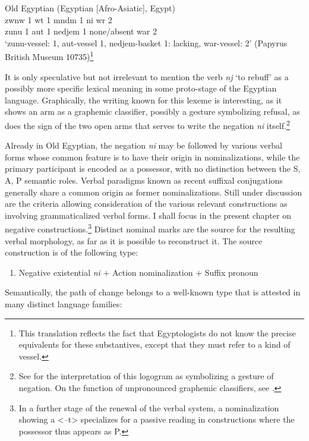 \documentclass[output=paper,draft,draftmode,colorlinks,citecolor=brown]{langscibook}
\begin{document}
\ea Old Egyptian (Egyptian [Afro-Asiatic], Egypt) \label{ex:AE3}\\
	\gll zwnw 1 {\ꜥ}wt 1 mndm 1 ni w{\ꜥ}r 2\\
	zunu 1 aut 1 nedjem 1 none/absent war 2\\
	\glt ‘zunu-vessel: 1, aut-vessel 1, nedjem-basket 1: lacking, war-vessel: 2’ (Papyrus	British Museum 10735)\footnote{This translation reflects the fact that Egyptologists do not know the precise equivalents for these substantives, except that they must refer to a kind of vessel.}
\z 

It is only speculative but not irrelevant to mention the verb \textit{nj} ‘to rebuff’ as a possibly more specific lexical meaning in some proto-stage of the Egyptian language. Graphically, the writing known for this lexeme is interesting, as it shows an arm as a graphemic classifier, possibly a gesture symbolizing refusal, as does the sign of the two open arms that serves to write the negation \textit{ni} itself.\footnote{See \citet[125]{Loprieno1995} for the interpretation of this logogram as symbolizing a gesture of negation. On the function of unpronounced graphemic classifiers, see \citet{GoldwasserGrinevald2012}.}

Already in Old Egyptian, the negation \textit{ni} may be followed by various verbal forms whose common feature is to have their origin in nominalizations, while the primary participant is encoded as a possessor, with no distinction between the S, A, P semantic roles. Verbal paradigms known as recent suffixal conjugations generally share a common origin as former nominalizations. Still under discussion are the criteria allowing consideration of the various relevant constructions as involving grammaticalized verbal forms. I shall focus in the present chapter on negative constructions.\footnote{In a further stage of the renewal of the verbal system, a nominalization showing a <–t> specializes for a passive reading in constructions where the possessor thus appears as P.} Distinct nominal marks are the source for the resulting verbal morphology, as far as it is possible to reconstruct it. The source construction is of the following type: 

\begin{enumerate}[label=(\roman*)] %
	\item Negative existential \textit{ni} $+$ Action nominalization $+$ Suffix pronoun
\end{enumerate}

Semantically, the path of change belongs to a well-known type that is attested in many distinct language families: 
\end{document}
